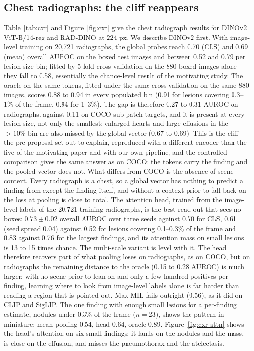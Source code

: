 \documentclass[10pt,letterpaper,twocolumn]{article}
\begin{document}
\subsection{Chest radiographs: the cliff reappears}
\label{sec:cxr-results}
Table~\ref{tab:cxr} and Figure~\ref{fig:cxr} give the chest radiograph results for DINOv2
ViT-B/14-reg and RAD-DINO at 224 px. We describe DINOv2 first. With image-level training on 20,721
radiographs, the global probes reach 0.70 (CLS) and 0.69 (mean) overall AUROC on the boxed
test images and between 0.52 and 0.79 per lesion-size bin; fitted by 5-fold cross-validation on
the 880 boxed images alone they fall to 0.58, essentially the chance-level result of the
motivating study. The oracle on the same tokens, fitted under the same cross-validation on the
same 880 images, scores 0.88 to 0.94 in every populated bin (0.91 for lesions covering 0.3--1\%
of the frame, 0.94 for 1--3\%). The gap is therefore 0.27 to 0.31 AUROC on radiographs,
against 0.11 on COCO sub-patch targets, and it is present at every lesion size, not only the
smallest: enlarged hearts and large effusions in the $>10\%$ bin are also missed by the global
vector (0.67 to 0.69). This is the cliff the pre-proposal set out to explain, reproduced with a
different encoder than the five of the motivating paper and with our own pipeline, and the
controlled comparison gives the same answer as on COCO: the tokens carry the finding and the
pooled vector does not. What differs from COCO is the absence of scene context. Every
radiograph is a chest, so a global vector has nothing to predict a finding from except the
finding itself, and without a context prior to fall back on the loss at pooling is close to
total. The attention head, trained from the image-level labels of the 20,721 training
radiographs, is the best read-out that sees no boxes: $0.73\pm0.02$ overall AUROC over three seeds against 0.70 for CLS, 0.61 (seed spread 0.04) against 0.52 for lesions covering 0.1--0.3\% of the frame and 0.83 against 0.76 for the largest findings, and its attention mass on small lesions is 13 to 15 times chance. The
multi-scale variant is level with it. The head therefore recovers part of what pooling loses
on radiographs, as on COCO, but on radiographs the remaining distance to the oracle (0.15 to
0.28 AUROC) is much larger: with no scene prior to lean on and only a few hundred positives
per finding, learning where to look from image-level labels alone is far harder than reading
a region that is pointed out. Max-MIL fails outright (0.56), as it did on CLIP and SigLIP.
The one finding with enough small lesions for a per-finding estimate, nodules under 0.3\% of
the frame ($n=23$), shows the pattern in miniature: mean pooling 0.54, head 0.64, oracle 0.89.
Figure~\ref{fig:cxr-attn} shows the head's attention on six small findings: it lands on the
nodules and the mass, is close on the effusion, and misses the pneumothorax and the
atelectasis.
\end{document}
